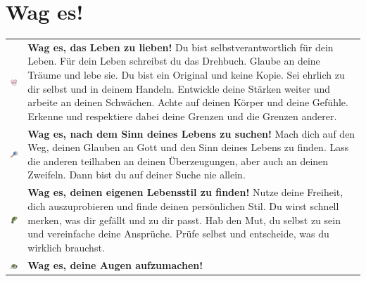 \section*{Wag es!}
	\footnotesize
	\centering
	\begin{tabular}{m{2cm}m{10cm}}
	\includegraphics[width=2cm]{Ausgaben/Sola24/Grafiken/heart.png} & \textbf{Wag es, das Leben zu lieben!} \newline
	Du bist selbstverantwortlich für dein Leben. Für dein Leben schreibst du das Drehbuch. Glaube an deine Träume und lebe sie. Du bist ein Original und keine Kopie. Sei ehrlich zu dir selbst und in deinem Handeln. Entwickle deine Stärken weiter und arbeite an deinen Schwächen. Achte auf deinen Körper und deine Gefühle. Erkenne und respektiere dabei deine Grenzen und die Grenzen anderer. \\
	\includegraphics[width=2cm]{Ausgaben/Sola24/Grafiken/lupe.jpg} & \textbf{Wag es, nach dem Sinn deines Lebens zu suchen!} \newline
	Mach dich auf den Weg, deinen Glauben an Gott und den Sinn deines Lebens zu finden. Lass die anderen teilhaben an deinen Überzeugungen, aber auch an deinen Zweifeln. Dann bist du auf deiner Suche nie allein. \\
	\includegraphics[width=2cm]{Ausgaben/Sola24/Grafiken/lebensstil.png} & \textbf{Wag es, deinen eigenen Lebensstil zu finden!} \newline
	Nutze deine Freiheit, dich auszuprobieren und finde deinen persönlichen Stil. Du wirst schnell merken, was dir gefällt und zu dir passt. Hab den Mut, du selbst zu sein und vereinfache deine Ansprüche. Prüfe selbst und entscheide, was du wirklich brauchst. \\
	\includegraphics[width=2cm]{Ausgaben/Sola24/Grafiken/eye.png} & \textbf{Wag es, deine Augen aufzumachen!} \newline

\end{tabular}
